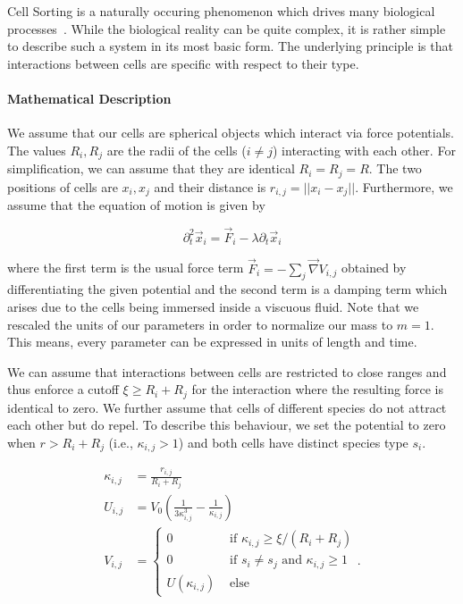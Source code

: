 \documentclass[fontsize=11pt,a4paper]{article}
\begin{document}
Cell Sorting is a naturally occuring phenomenon which drives many biological
processes~\cite{Steinberg1963,Graner1992}.
While the biological reality can be quite complex, it is rather simple to describe such
a system in its most basic form.
The underlying principle is that interactions between cells are specific with respect to their type.

\paragraph{Mathematical Description}
We assume that our cells are spherical objects which interact via force potentials.
The values $R_i,R_j$ are the radii of the cells ($i\neq j$) interacting with each other.
For simplification, we can assume that they are identical $R_i=R_j=R$.
The two positions of cells are $x_i,x_j$ and their distance is $r_{i,j}=||x_i-x_j||$.
Furthermore, we assume that the equation of motion is given by

\begin{equation}
    \partial^2_t \vec{x}_i = \vec{F}_i - \lambda \partial_t \vec{x}_i
\end{equation}

where the first term is the usual force term $\vec{F}_i = - \sum_j\vec{\nabla} V_{i,j}$ obtained by
differentiating the given potential and the second term is a damping term which arises due to the
cells being immersed inside a viscuous fluid.
Note that we rescaled the units of our parameters in order to normalize our mass to $m=1$.
This means, every parameter can be expressed in units of length and time.

We can assume that interactions between cells are restricted to close ranges and thus enforce a
cutoff $\xi\geq R_i+R_j$ for the interaction where the resulting force is identical to zero.
We further assume that cells of different species do not attract each other but do repel.
To describe this behaviour, we set the potential to zero when $r>R_i+R_j$ (i.e., $\kappa_{i,j}>1$)
and both cells have distinct species type $s_i$.

\begin{align}
    \kappa_{i,j} &= \frac{r_{i,j}}{R_i + R_j}\\
    U_{i,j} &= V_0 \left(\frac{1}{3\kappa_{i,j}^3} - \frac{1}{\kappa_{i,j}}\right)\\
    V_{i,j} &=
    \begin{cases}
        0 &\text{ if } \kappa_{i,j}\geq\xi/(R_i+R_j)\\
        0 &\text{ if } s_i\neq s_j \text{ and } \kappa_{i,j}\geq 1\\
        U(\kappa_{i,j}) &\text{ else }
    \end{cases}.
\end{align}
\end{document}
